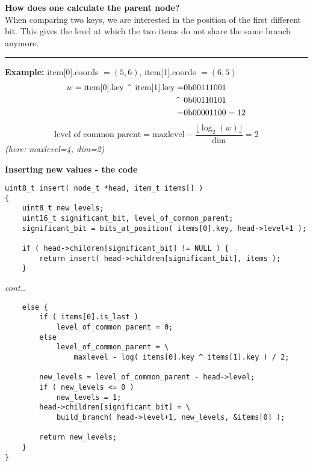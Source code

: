 \begin{frame}
    \textbf{How does one calculate the parent node?} \\
    When comparing two keys, we are interested in the position of the first
    different bit. This gives the level at which the two items do not share
    the same branch anymore.

    \noindent\rule{\textwidth}{1pt}

    \textbf{Example:} item[0].coords $= (5, 6)$, item[1].coords $= (6, 5)$ \\
    \begin{align}
        \begin{split}
            w = \textrm{item[0].key} \textrm{\textbf{ \^{} }} \textrm{item[1].key} =& 0\textrm{b}00111001 \\
            \textrm{\textbf{ \^{} }}& 0\textrm{b}00110101 \\
            =& 0\textrm{b}00001100 = 12
        \end{split}
    \end{align}
    \begin{equation}
        \textrm{level of common parent} =
        \textrm{maxlevel}-\frac{\lfloor \log_2\left(w\right)
        \rfloor}{\textrm{dim}} = 2
    \end{equation}
    {\small\textit{(here: maxlevel=4, dim=2)}}
\end{frame}

\begin{frame}[fragile]
    \textbf{Inserting new values - the code}
    \begin{verbatim}
uint8_t insert( node_t *head, item_t items[] )
{
    uint8_t new_levels;
    uint16_t significant_bit, level_of_common_parent;
    significant_bit = bits_at_position( items[0].key, head->level+1 );

    if ( head->children[significant_bit] != NULL ) {
        return insert( head->children[significant_bit], items );
    }
    \end{verbatim}
\end{frame}

\begin{frame}[fragile]
    \textit{cont\dots}
    \begin{verbatim}
    else {
        if ( items[0].is_last )
            level_of_common_parent = 0;
        else
            level_of_common_parent = \
                maxlevel - log( items[0].key ^ items[1].key ) / 2;

        new_levels = level_of_common_parent - head->level;
        if ( new_levels <= 0 )
            new_levels = 1;
        head->children[significant_bit] = \
            build_branch( head->level+1, new_levels, &items[0] );

        return new_levels;
    }
}
    \end{verbatim}
\end{frame}


